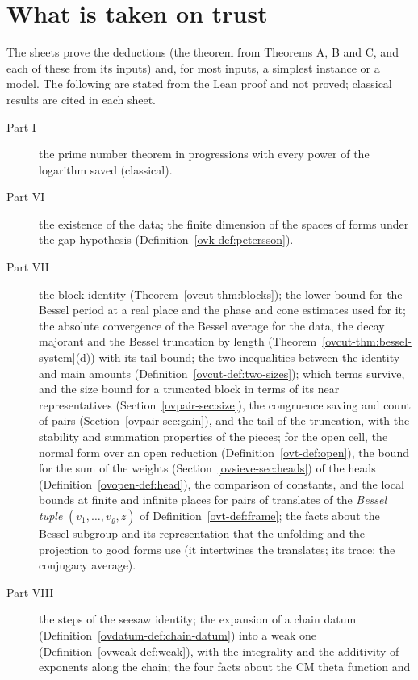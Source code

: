 \documentclass[reqno]{amsart}
\theoremstyle{definition}
\begin{document}
\section{What is taken on trust}\label{sec:trust}

The sheets prove the deductions (the theorem from Theorems A, B and C, and
  each of these from its inputs) and, for most inputs, a simplest instance
  or a model.  The following are stated from the Lean proof and not proved;
  classical results are cited in each sheet.
\begin{description}
\item[Part I] the prime number theorem in progressions with every power of
  the logarithm saved (classical).
\item[Part VI] the existence of the data; the finite dimension of the spaces
  of forms under the gap hypothesis (Definition~\ref{ovk-def:petersson}).
\item[Part VII] the block identity (Theorem~\ref{ovcut-thm:blocks}); the lower bound for the Bessel period at
  a real place and the phase and cone estimates used for it; the absolute
  convergence of the Bessel average for the data, the decay majorant and the
  Bessel truncation by length (Theorem~\ref{ovcut-thm:bessel-system}(d)) with its tail bound; the two inequalities between the identity and
  main amounts (Definition~\ref{ovcut-def:two-sizes}); which terms survive,
  and the size bound for a truncated block in terms of its near representatives
  (Section~\ref{ovpair-sec:size}), the congruence saving and count of pairs
  (Section~\ref{ovpair-sec:gain}), and the
  tail of the truncation, with the stability and summation properties of the
  pieces; for the open cell, the normal form over an open reduction (Definition~\ref{ovt-def:open}),
  the bound for the sum of the weights (Section~\ref{ovsieve-sec:heads}) of the heads (Definition~\ref{ovopen-def:head}), the comparison of constants, and
  the local bounds at finite and infinite places for pairs of translates of the \emph{Bessel tuple} \((v_1,\dots,v_\varrho,z)\) of Definition~\ref{ovt-def:frame}; the
  facts about the Bessel subgroup and its representation that the unfolding
  and the projection to good forms use (it intertwines the translates; its
  trace; the conjugacy average).
\item[Part VIII] the steps of the seesaw identity; the expansion of a chain
  datum (Definition~\ref{ovdatum-def:chain-datum}) into a weak one
  (Definition~\ref{ovweak-def:weak}), with the integrality and the additivity of
  exponents along the chain; the four facts about the CM theta function and

\end{description}
\end{document}
